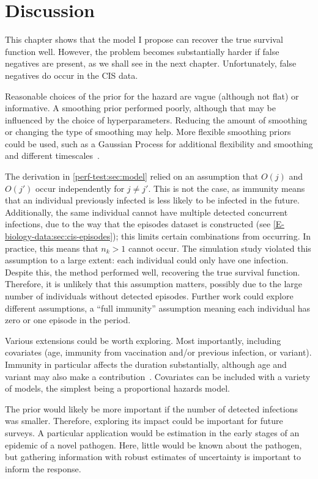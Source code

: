 \documentclass[thesis.tex]{subfiles}
\begin{document}
\section{Discussion} \label{perf-test:sec:discussion}

This chapter shows that the model I propose can recover the true survival function well.
However, the problem becomes substantially harder if false negatives are present, as we shall see in the next chapter.
Unfortunately, false negatives do occur in the CIS data.

Reasonable choices of the prior for the hazard are vague (although not flat) or informative.
A smoothing prior performed poorly, although that may be influenced by the choice of hyperparameters.
Reducing the amount of smoothing or changing the type of smoothing may help.
More flexible smoothing priors could be used, such as a Gaussian Process for additional flexibility and smoothing and different timescales~\autocite{saulGaussian}.

The derivation in \cref{perf-test:sec:model} relied on an assumption that $O(j)$ and $O(j')$ occur independently for $j \neq j'$.
This is not the case, as immunity means that an individual previously infected is less likely to be infected in the future.
Additionally, the same individual cannot have multiple detected concurrent infections, due to the way that the episodes dataset is constructed (see \cref{E-biology-data:sec:cis-episodes}); this limits certain combinations from occurring.
In practice, this means that $n_k > 1$ cannot occur.
The simulation study violated this assumption to a large extent: each individual could only have one infection.
Despite this, the method performed well, recovering the true survival function.
Therefore, it is unlikely that this assumption matters, possibly due to the large number of individuals without detected episodes.
Further work could explore different assumptions, \eg a ``full immunity'' assumption meaning each individual has zero or one episode in the period.

Various extensions could be worth exploring.
Most importantly, including covariates (\eg age, immunity from vaccination and/or previous infection, or variant).
Immunity in particular affects the duration substantially, although age and variant may also make a contribution~\autocite{hakkiOnset,russellWithinhost}.
Covariates can be included with a variety of models, the simplest being a proportional hazards model.

The prior would likely be more important if the number of detected infections was smaller.
Therefore, exploring its impact could be important for future surveys.
A particular application would be estimation in the early stages of an epidemic of a novel pathogen.
Here, little would be known about the pathogen, but gathering information with robust estimates of uncertainty is important to inform the response.
\end{document}
